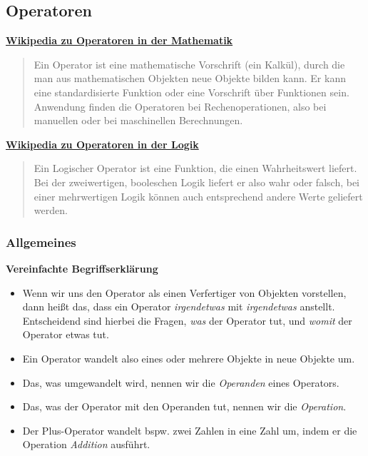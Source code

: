 
\subsection{Operatoren}


\vspace{0.5cm}\par\noindent\textbf{\href{http://de.wikipedia.org/wiki/Operator_(Mathematik)}{Wikipedia\vspace{0.5cm}
zu Operatoren in der Mathematik}}

\begin{quote}
Ein Operator ist eine mathematische Vorschrift (ein Kalkül), durch die
man aus mathematischen Objekten neue Objekte bilden kann. Er kann eine
standardisierte Funktion oder eine Vorschrift über Funktionen sein.
Anwendung finden die Operatoren bei Rechenoperationen, also bei
manuellen oder bei maschinellen Berechnungen.
\end{quote}



\vspace{0.5cm}\par\noindent\textbf{\href{http://de.wikipedia.org/wiki/Operator_(Logik)}{Wikipedia\vspace{0.5cm}
zu Operatoren in der Logik}}

\begin{quote}
Ein Logischer Operator ist eine Funktion, die einen Wahrheitswert
liefert. Bei der zweiwertigen, booleschen Logik liefert er also wahr
oder falsch, bei einer mehrwertigen Logik können auch entsprechend
andere Werte geliefert werden.
\end{quote}


\subsubsection{Allgemeines}

\vspace{0.5cm}\par\noindent\textbf{Vereinfachte Begriffserklärung}\vspace{0.5cm}

\begin{itemize}
\itemsep1pt\parskip0pt
\item
  {Wenn wir uns den Operator als einen Verfertiger von Objekten
  vorstellen, dann heißt das, dass ein Operator \emph{irgendetwas} mit
  \emph{irgendetwas} anstellt. Entscheidend sind hierbei die Fragen,
  \emph{was} der Operator tut, und \emph{womit} der Operator etwas tut.}
\item
  {Ein Operator wandelt also eines oder mehrere Objekte in neue Objekte
  um.}
\item
  {Das, was umgewandelt wird, nennen wir die \emph{Operanden} eines
  Operators.}
\item
  {Das, was der Operator mit den Operanden tut, nennen wir die
  \emph{Operation}.}
\item
  {Der Plus-Operator wandelt bspw. zwei Zahlen in eine Zahl um, indem er
  die Operation \emph{Addition} ausführt.}
\end{itemize}



